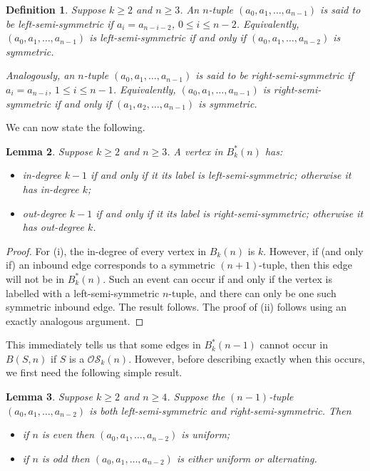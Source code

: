 \documentclass[a4paper,11pt]{article}
\newtheorem{lemma}{Lemma}[section]
\newtheorem{definition}[lemma]{Definition}
\begin{document}
\begin{definition}
Suppose $k\geq2$ and $n\geq3$.  An $n$-tuple $(a_0,a_1,\ldots,a_{n-1})$ is said to be
\emph{left-semi-symmetric} if $a_i=a_{n-i-2}$, $0\leq i\leq n-2$.  Equivalently,
$(a_0,a_1,\ldots,a_{n-1})$ is left-semi-symmetric if and only if $(a_0,a_1,\ldots,a_{n-2})$ is
symmetric.

Analogously, an $n$-tuple $(a_0,a_1,\ldots,a_{n-1})$ is said to be \emph{right-semi-symmetric} if
$a_i=a_{n-i}$, $1\leq i\leq n-1$.  Equivalently, $(a_0,a_1,\ldots,a_{n-1})$ is right-semi-symmetric
if and only if $(a_1,a_2,\ldots,a_{n-1})$ is symmetric.
\end{definition}

We can now state the following.

\begin{lemma}  \label{lemma:vertex_degree_k-1}
Suppose $k\geq2$ and $n\geq3$.  A vertex in $B^*_k(n)$ has:
\begin{itemize}
\item[i)] in-degree $k-1$ if and only if it its label is left-semi-symmetric; otherwise it has
    in-degree $k$;
\item[ii)] out-degree $k-1$ if and only if it its label is right-semi-symmetric; otherwise it
    has out-degree $k$.
\end{itemize}
\end{lemma}

\begin{proof}
For (i), the in-degree of every vertex in $B_k(n)$ is $k$.  However, if (and only if) an inbound
edge corresponds to a symmetric $(n+1)$-tuple, then this edge will not be in $B_k^*(n)$.  Such an
event can occur if and only if the vertex is labelled with a left-semi-symmetric $n$-tuple, and
there can only be one such symmetric inbound edge.  The result follows.  The proof of (ii) follows
using an exactly analogous argument.
\end{proof}

This immediately tells us that some edges in $B^*_k(n-1)$ cannot occur in $B(S,n)$ if $S$ is a
$\mathcal{OS}_k(n)$.  However, before describing exactly when this occurs, we first need the
following simple result.

\begin{lemma}  \label{lemma:combining_left_right-semi-symmetric}
Suppose $k\geq2$ and $n\geq4$.  Suppose the $(n-1)$-tuple $(a_0,a_1,\ldots,a_{n-2})$ is both
left-semi-symmetric and right-semi-symmetric.  Then
\begin{itemize}
\item[i)] if $n$ is even then $(a_0,a_1,\ldots,a_{n-2})$ is uniform;
\item[ii)] if $n$ is odd then $(a_0,a_1,\ldots,a_{n-2})$ is either uniform or alternating.
\end{itemize}
\end{lemma}
\end{document}
